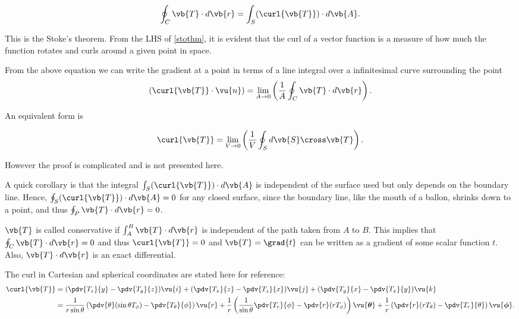 \documentclass[english,a4paper,12pt]{report}
\begin{document}
\begin{equation} 
	\oint_{C} \vb{T} \cdot d\vb{r} = \int_{S} (\curl{\vb{T}}) \cdot d\vb{A}. \label{stothm} 
\end{equation}
	
This is the Stoke's theorem. From the LHS of \cref{stothm}, it is evident that the curl of a vector function is a measure of how much the function rotates and curls around a given point in space.
	
From the above equation we can write the gradient at a point in terms of a line integral over a infinitesimal curve surrounding the point
\begin{equation}
	(\curl{\vb{T} } \cdot \vu{n} ) = \lim_{A \to 0} \left( \frac{1}{A} \oint_{C} \vb{T} \cdot d\vb{r}  \right). 
\end{equation}

An equivalent form is 

\begin{equation}
	\curl{\vb{T} } = \lim_{V \to 0} \left( \frac{1}{V} \oint_{S} d\vb{S} \cross \vb{T}  \right).
\end{equation}

However the proof is complicated and is not presented here.


A quick corollary is that the integral \(\int_{S} (\curl{\vb{T}}) \cdot d\vb{A}\) is independent of the surface used but only depends on the boundary line. Hence, \( \oint_{S} (\curl{\vb{T}}) \cdot d\vb{A} = 0\) for any closed surface, since the boundary line, like the mouth of a ballon, shrinks down to a point, and thus \(\oint_{P} \vb{T} \cdot d\vb{r} = 0\).

\(\vb{T} \) is called conservative if \(\int_{A}^{B}  \vb{T} \cdot d\vb{r}  \) is independent of the path taken from \(A\) to \(B\). This implies that \( \oint_{C} \vb{T} \cdot d\vb{r} = 0\) and thus \(\curl{\vb{T} } = 0\) and \(\vb{T} = \grad{t} \) can be written as a gradient of some scalar function \(t\). Also, \(\vb{T} \cdot d\vb{r} \) is an exact differential.      

The curl in Cartesian and spherical coordinates are stated here for reference:
\begin{equation} 
	\begin{aligned}
	\curl{\vb{T}} &= (\pdv{T_z}{y} - \pdv{T_y}{z})\vu{i} + (\pdv{T_x}{z} - \pdv{T_z}{x})\vu{j} + (\pdv{T_y}{x} - \pdv{T_x}{y})\vu{k} \\ &= \frac{1}{r\sin{\theta}}\left(\pdv{\theta}(\sin{\theta}T_{\phi}) - \pdv{T_{\theta}}{\phi}\right)\vu{r} + \frac{1}{r}\left(\frac{1}{\sin{\theta}}\pdv{T_r}{\phi} - \pdv{r}(rT_{\phi})\right)\vu{\boldsymbol{\theta } } + \frac{1}{r}\left(\pdv{r}(rT_{\theta}) - \pdv{T_r}{\theta}\right)\vu{\boldsymbol{\phi } }. 
    \end{aligned}
\end{equation}
	
\end{document}
